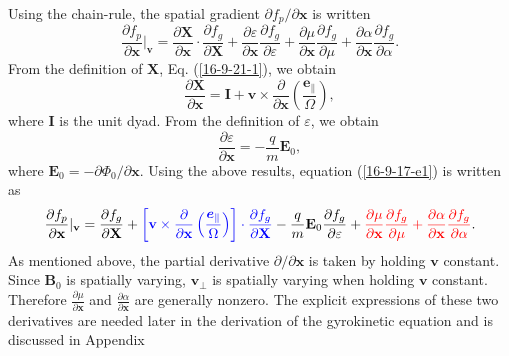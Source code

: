 \documentclass{llncs}
\newcommand{\nobracket}{}
\newcommand{\tmcolor}[2]{{\color{#1}{#2}}}
\newcommand{\tmmathbf}[1]{\ensuremath{\boldsymbol{#1}}}
\begin{document}
Using the chain-rule, the spatial gradient $\partial f_p / \partial
\mathbf{x}$ is written
\begin{equation}
  \label{16-9-17-e1} \frac{\partial f_p}{\partial \mathbf{x}} |_{\mathbf{v}}
  \nobracket = \frac{\partial \mathbf{X}}{\partial \mathbf{x}} \cdot
  \frac{\partial f_g}{\partial \mathbf{X}} + \frac{\partial
  \varepsilon}{\partial \mathbf{x}}  \frac{\partial f_g}{\partial \varepsilon}
  + \frac{\partial \mu}{\partial \mathbf{x}}  \frac{\partial f_g}{\partial
  \mu} + \frac{\partial \alpha}{\partial \mathbf{x}}  \frac{\partial
  f_g}{\partial \alpha} .
\end{equation}
From the definition of $\mathbf{X}$, Eq. (\ref{16-9-21-1}), we obtain
\begin{equation}
  \frac{\partial \mathbf{X}}{\partial \mathbf{x}} =\mathbf{I}+\mathbf{v}
  \times \frac{\partial}{\partial \mathbf{x}} \left(
  \frac{\tmmathbf{e}_{\parallel}}{\Omega} \right),
\end{equation}
where $\mathbf{I}$ is the unit dyad. From the definition of $\varepsilon$, we
obtain
\begin{equation}
  \frac{\partial \varepsilon}{\partial \mathbf{x}} = - \frac{q}{m}
  \mathbf{E}_0,
\end{equation}
where $\mathbf{E}_0 = - \partial \Phi_0 / \partial \mathbf{x}$. Using the
above results, equation (\ref{16-9-17-e1}) is written as
\begin{equation}
  \label{22-9-24-p1} \frac{\partial f_p}{\partial \mathbf{x}} |_{\mathbf{v}}
  \nobracket = \frac{\partial f_g}{\partial \mathbf{X}} +
  \tmcolor{blue}{\left[ \mathbf{v} \times \frac{\partial}{\partial \mathbf{x}}
  \left( \frac{\tmmathbf{e}_{\parallel}}{\Omega} \right) \right] \cdot
  \frac{\partial f_g}{\partial \mathbf{X}}} - \frac{q}{m} \mathbf{E}_0
  \frac{\partial f_g}{\partial \varepsilon} + \tmcolor{red}{\frac{\partial
  \mu}{\partial \mathbf{x}}  \frac{\partial f_g}{\partial \mu} +
  \frac{\partial \alpha}{\partial \mathbf{x}}  \frac{\partial f_g}{\partial
  \alpha}} .
\end{equation}
As mentioned above, the partial derivative $\partial / \partial \mathbf{x}$ is
taken by holding $\mathbf{v}$ constant. Since $\mathbf{B}_0$ is spatially
varying, $\mathbf{v}_{\perp}$ is spatially varying when holding $\mathbf{v}$
constant. Therefore $\frac{\partial \mu}{\partial \mathbf{x}}$ and
$\frac{\partial \alpha}{\partial \mathbf{x}}$ are generally nonzero. The
explicit expressions of these two derivatives are needed later in the
derivation of the gyrokinetic equation and is discussed in Appendix
\end{document}

